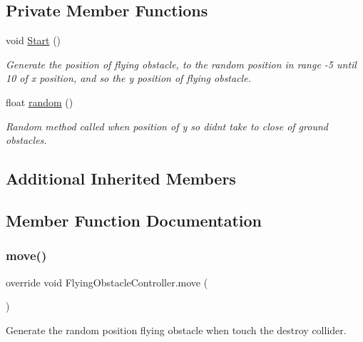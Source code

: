 \subsection*{Private Member Functions}
\begin{DoxyCompactItemize}
\item 
void \hyperlink{class_flying_obstacle_controller_a8da1b0b0f2acdd0b411d892740c39831}{Start} ()
\begin{DoxyCompactList}\small\item\em Generate the position of flying obstacle, to the random position in range -\/5 until 10 of x position, and so the y position of flying obstacle. \end{DoxyCompactList}\item 
float \hyperlink{class_flying_obstacle_controller_a18b0c286d961a4f8edb8abff1efd87f9}{random} ()
\begin{DoxyCompactList}\small\item\em Random method called when position of y so didn\textquotesingle{}t take to close of ground obstacles. \end{DoxyCompactList}\end{DoxyCompactItemize}
\subsection*{Additional Inherited Members}


\subsection{Member Function Documentation}
\hypertarget{class_flying_obstacle_controller_afd00f43efeabf1068a6ddb7ece716700}{}\label{class_flying_obstacle_controller_afd00f43efeabf1068a6ddb7ece716700} 
\subsubsection{\texorpdfstring{move()}{move()}}
{\footnotesize\ttfamily override void Flying\+Obstacle\+Controller.\+move (\begin{DoxyParamCaption}{ }\end{DoxyParamCaption})\hspace{0.3cm}{\ttfamily [virtual]}}



Generate the random position flying obstacle when touch the destroy collider. 



